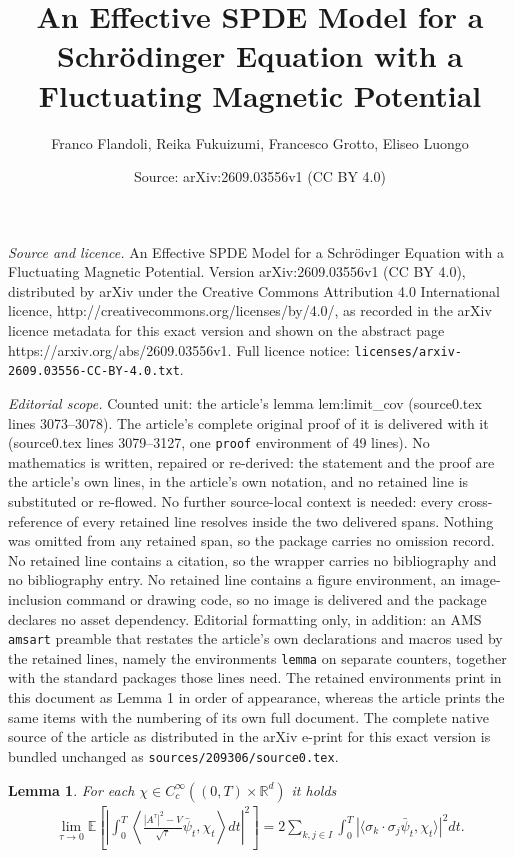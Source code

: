 \documentclass[10pt,a4paper]{amsart}
\title{An Effective SPDE Model for a Schr\"odinger Equation with a Fluctuating Magnetic Potential}
\author{Franco Flandoli, Reika Fukuizumi, Francesco Grotto, Eliseo Luongo}
\date{Source: arXiv:2609.03556v1 (CC BY 4.0)}
\newtheorem{lemma}{Lemma}
\newcommand{\R}{\mathbb{R}}
\begin{document}
\maketitle

\noindent\emph{Source and licence.} An Effective SPDE Model for a Schr\"odinger Equation with a Fluctuating Magnetic Potential. Version arXiv:2609.03556v1 (CC BY 4.0), distributed by arXiv under the Creative Commons Attribution 4.0 International licence, http://creativecommons.org/licenses/by/4.0/, as recorded in the arXiv licence metadata for this exact version and shown on the abstract page https://arxiv.org/abs/2609.03556v1. Full licence notice: \texttt{licenses/arxiv-2609.03556-CC-BY-4.0.txt}.\par\smallskip

\noindent\textit{Editorial scope.} Counted unit: the article's lemma lem:limit\_cov (source0.tex lines 3073--3078). The article's complete original proof of it is delivered with it (source0.tex lines 3079--3127, one \texttt{proof} environment of 49 lines). No mathematics is written, repaired or re-derived: the statement and the proof are the article's own lines, in the article's own notation, and no retained line is substituted or re-flowed.  No further source-local context is needed: every cross-reference of every retained line resolves inside the two delivered spans.  Nothing was omitted from any retained span, so the package carries no omission record.  No retained line contains a citation, so the wrapper carries no bibliography and no bibliography entry.  No retained line contains a figure environment, an image-inclusion command or drawing code, so no image is delivered and the package declares no asset dependency.  Editorial formatting only, in addition: an AMS \texttt{amsart} preamble that restates the article's own declarations and macros used by the retained lines, namely the environments \texttt{lemma} on separate counters, together with the standard packages those lines need.  The retained environments print in this document as Lemma 1 in order of appearance, whereas the article prints the same items with the numbering of its own full document.  The complete native source of the article as distributed in the arXiv e-print for this exact version is bundled unchanged as \texttt{sources/209306/source0.tex}.
\begin{lemma}\label{lem:limit_cov}
    For each $\chi\in C^{\infty}_c((0,T)\times \R^d)$ it holds
    \begin{align*}
        \lim_{\tau\rightarrow 0}\mathbb{E}\left[\left|\int_0^T \left\langle \frac{|A^\tau|^2-V}{\sqrt{\tau}}\bar\psi_t,\chi_t\right\rangle dt \right|^2 \right]=2 \sum_{k,j\in I}\int_0^T |\langle \sigma_k\cdot\sigma_j\bar\psi_t, \chi_t \rangle|^2 dt.
    \end{align*}
\end{lemma}
\end{document}
